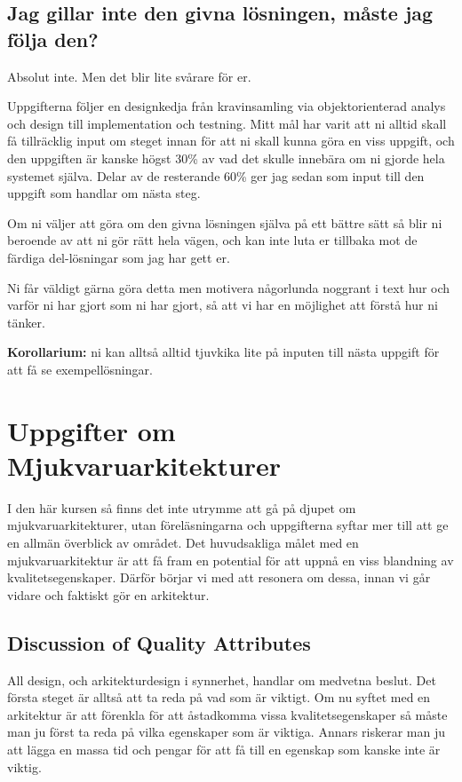 \documentclass[8pt,oneside]{memoir}
\begin{document}
\chapter{Jag gillar inte den givna lösningen, måste jag följa den?}
\label{sec:orgdc6fcff}
Absolut inte. Men det blir lite svårare för er.

Uppgifterna följer en designkedja från kravinsamling via objektorienterad analys och design till implementation och testning. Mitt mål har varit att ni alltid skall få tillräcklig input om steget innan för att ni skall kunna göra en viss uppgift, och den uppgiften är kanske högst 30\% av vad det skulle innebära om ni gjorde hela systemet själva. Delar av de resterande 60\% ger jag sedan som input till den uppgift som handlar om nästa steg.

Om ni väljer att göra om den givna lösningen själva på ett bättre sätt så blir ni beroende av att ni gör rätt hela vägen, och kan inte luta er tillbaka mot de färdiga del-lösningar som jag har gett er.

Ni får väldigt gärna göra detta men motivera någorlunda noggrant i text hur och varför ni har gjort som ni har gjort, så att vi har en möjlighet att förstå hur ni tänker.

\textbf{Korollarium:} ni kan alltså alltid tjuvkika lite på inputen till nästa uppgift för att få se exempellösningar.
\part{Uppgifter om Mjukvaruarkitekturer}
\label{sec:org6f4e320}
I den här kursen så finns det inte utrymme att gå på djupet om mjukvaruarkitekturer, utan föreläsningarna och uppgifterna syftar mer till att ge en allmän överblick av området. Det huvudsakliga målet med en mjukvaruarkitektur är att få fram en potential för att uppnå en viss blandning av kvalitetsegenskaper. Därför börjar vi med att resonera om dessa, innan vi går vidare och faktiskt gör en arkitektur.
\chapter{Discussion of Quality Attributes}
\label{sec:org9aa0548}
All design, och arkitekturdesign i synnerhet, handlar om medvetna beslut. Det första steget är alltså att ta reda på vad som är viktigt. Om nu syftet med en arkitektur är att förenkla för att åstadkomma vissa kvalitetsegenskaper så måste man ju först ta reda på vilka egenskaper som är viktiga. Annars riskerar man ju att lägga en massa tid och pengar för att få till en egenskap som kanske inte är viktig.
\end{document}
